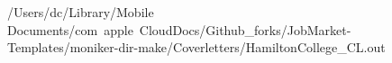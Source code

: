 /Users/dc/Library/Mobile Documents/com~apple~CloudDocs/Github_forks/JobMarket-Templates/moniker-dir-make/Coverletters/HamiltonCollege_CL.out